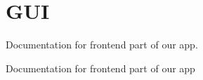 \chapter{GUI}
\hypertarget{index}{}\label{index}
Documentation for frontend part of our app.

Documentation for frontend part of our app    